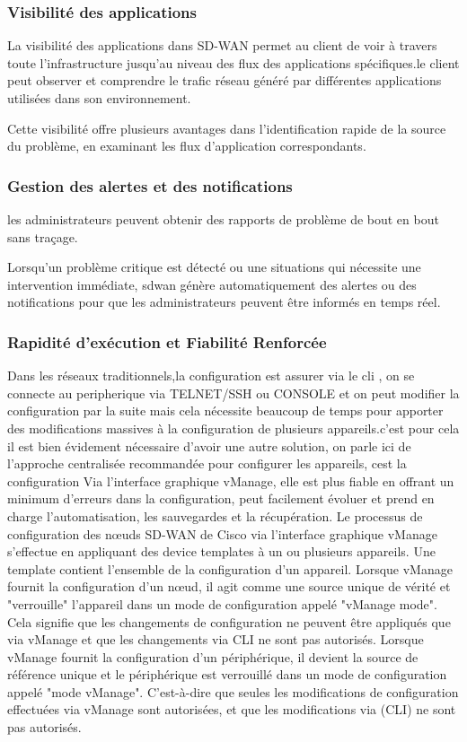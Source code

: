 \subsubsection{Visibilité des applications  }

La visibilité des applications dans SD-WAN permet au client de voir à travers toute l'infrastructure jusqu'au niveau des flux des applications spécifiques.le client peut observer et comprendre le trafic réseau généré par différentes applications utilisées dans son environnement. 

Cette visibilité offre plusieurs avantages dans  l’identification rapide  de la source du problème, en examinant les flux d'application correspondants.

\subsubsection{Gestion des alertes et des notifications   }

les administrateurs peuvent obtenir des rapports de problème de bout en bout sans traçage.

Lorsqu'un problème critique est détecté  ou une situations qui nécessite  une intervention immédiate, sdwan génère automatiquement des alertes ou des notifications pour que les administrateurs peuvent être informés en temps réel.

\subsubsection{Rapidité d’exécution et Fiabilité Renforcée  }
Dans les réseaux traditionnels,la configuration est assurer via le cli , on se connecte au peripherique via TELNET/SSH ou CONSOLE et on peut modifier la configuration par la suite mais cela nécessite beaucoup de temps pour apporter des modifications massives à la configuration de plusieurs appareils.c’est pour cela il est bien évidement nécessaire d’avoir une autre solution, on parle ici de l'approche centralisée recommandée pour configurer les appareils, cest la configuration Via l'interface graphique vManage, elle est plus fiable en offrant un minimum d’erreurs dans la configuration, peut facilement évoluer et prend en charge l'automatisation, les sauvegardes et la récupération.
Le processus de configuration des nœuds SD-WAN de Cisco via l'interface graphique vManage s'effectue en appliquant des device templates à un ou plusieurs appareils. Une template  contient l'ensemble de la configuration d'un appareil. Lorsque vManage fournit la configuration d'un nœud, il agit comme une source unique de vérité et "verrouille" l'appareil dans un mode de configuration appelé "vManage mode". Cela signifie que les changements de configuration ne peuvent être appliqués que via vManage et que les changements via CLI ne sont pas autorisés.   
Lorsque vManage fournit  la configuration d'un périphérique, il devient la source de référence unique et le périphérique est verrouillé dans un mode de configuration appelé "mode vManage". C’est-à-dire  que seules les modifications de configuration effectuées via vManage sont autorisées, et que les modifications via (CLI) ne sont pas autorisés.

